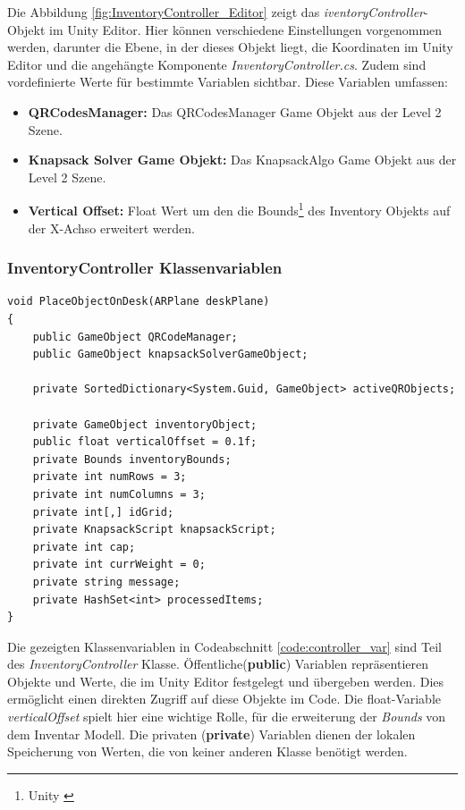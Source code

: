 Die Abbildung \ref{fig:InventoryController_Editor} zeigt das \textit{iventoryController}-Objekt im Unity Editor.  Hier
können verschiedene Einstellungen vorgenommen werden, darunter die Ebene, in der dieses Objekt liegt, die Koordinaten
im Unity Editor und die angehängte Komponente \textit{InventoryController.cs}. Zudem sind vordefinierte Werte für bestimmte
Variablen sichtbar. Diese Variablen umfassen:

\begin{itemize}
    \item \textbf{QRCodesManager:} Das QRCodesManager Game Objekt aus der Level 2 Szene.
    \item \textbf{Knapsack Solver Game Objekt:} Das KnapsackAlgo Game Objekt aus der Level 2 Szene.
    \item \textbf{Vertical Offset:} Float Wert um den die Bounds\footnote{Unity \cite{Bounds}} des Inventory Objekts auf der X-Achso erweitert werden.\\
\end{itemize}

\subsubsection{InventoryController Klassenvariablen}
\begin{lstlisting}[style=csharp, caption={Klassenvariablen der InventoryController Klasse}, label=code:controller_var]
void PlaceObjectOnDesk(ARPlane deskPlane)
{
    public GameObject QRCodeManager;
    public GameObject knapsackSolverGameObject;

    private SortedDictionary<System.Guid, GameObject> activeQRObjects;

    private GameObject inventoryObject;
    public float verticalOffset = 0.1f;
    private Bounds inventoryBounds;
    private int numRows = 3;
    private int numColumns = 3;
    private int[,] idGrid;
    private KnapsackScript knapsackScript;
    private int cap;
    private int currWeight = 0;
    private string message;
    private HashSet<int> processedItems;
}
\end{lstlisting}
Die gezeigten Klassenvariablen in Codeabschnitt \ref{code:controller_var} sind Teil des \textit{InventoryController} Klasse.
Öffentliche(\textbf{public}) Variablen repräsentieren Objekte und Werte, die im Unity Editor festgelegt und übergeben werden. Dies
ermöglicht einen direkten Zugriff auf diese Objekte im Code. Die float-Variable \textit{verticalOffset} spielt hier eine
wichtige Rolle, für die erweiterung der \textit{Bounds} von dem Inventar Modell. Die privaten (\textbf{private}) Variablen dienen
der lokalen Speicherung von Werten, die von keiner anderen Klasse benötigt werden.\\

